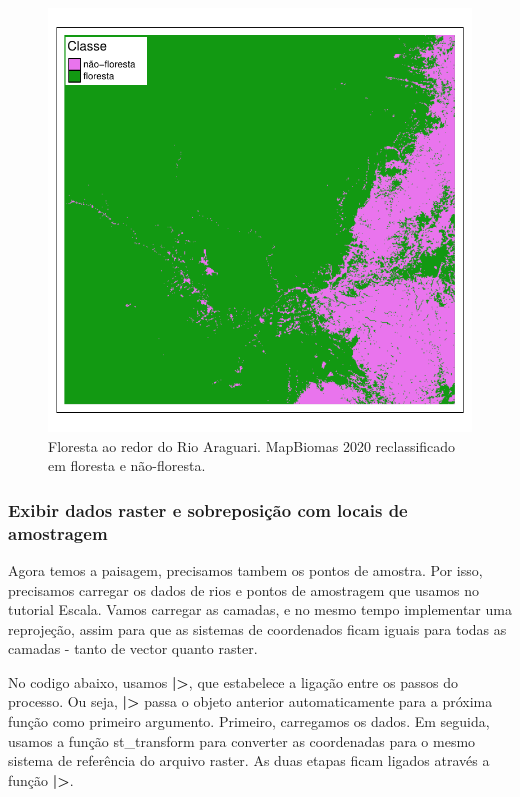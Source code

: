 \documentclass[
]{article}
\begin{document}
\begin{figure}
\centering
\includegraphics{epr_files/figure-latex/unnamed-chunk-23-1.pdf}
\caption{\label{fig:unnamed-chunk-23}Floresta ao redor do Rio Araguari. MapBiomas 2020 reclassificado em floresta e não-floresta.}
\end{figure}

\hypertarget{exibir-dados-raster-e-sobreposiuxe7uxe3o-com-locais-de-amostragem}{%
\subsubsection{Exibir dados raster e sobreposição com locais de amostragem}\label{exibir-dados-raster-e-sobreposiuxe7uxe3o-com-locais-de-amostragem}}

Agora temos a paisagem, precisamos tambem os pontos de amostra. Por isso, precisamos carregar os dados de rios e pontos de amostragem que usamos no tutorial Escala. Vamos carregar as camadas, e no mesmo tempo implementar uma reprojeção, assim para que as sistemas de coordenados ficam iguais para todas as camadas - tanto de vector quanto raster.

No codigo abaixo, usamos \textbf{|>}, que estabelece a ligação entre os passos do processo. Ou seja, \textbf{|>} passa o objeto anterior automaticamente para a próxima função como primeiro argumento.
Primeiro, carregamos os dados. Em seguida, usamos a função \colorbox[HTML]{dedede}{st\_transform} para converter as coordenadas para o mesmo sistema de referência do arquivo raster. As duas etapas ficam ligados através a função \textbf{|>}.
\end{document}
